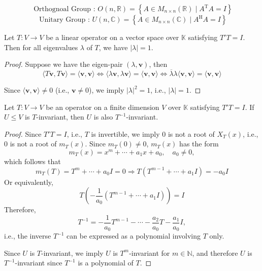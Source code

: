 \begin{definition}
\[
\text{ Orthognoal Group : }O\left( {n,\mathbb{R}}\right)  = \left\{  {A \in  {M}_{n \times  n}\left( \mathbb{R}\right)  \mid  {A}^{\mathrm{T}}A = I}\right\}
\]
\[
\text{ Unitary Group : }U\left( {n,\mathbb{C}}\right)  = \left\{  {A \in  {M}_{n \times  n}\left( \mathbb{C}\right)  \mid  {A}^{\mathrm{H}}A = I}\right\}
\]
\end{definition}


\begin{proposition}
Let \( T : V \rightarrow V \) be a linear operator on a vector space over \( \mathbb{K} \) satisfying \( T' T = I \). Then for all eigenvalues \( \lambda \) of \( T \), we have \( |\lambda| = 1 \).
\end{proposition}

\begin{proof}
Suppose we have the eigen-pair \( (\lambda, \mathbf{v}) \), then
\[
\langle T\mathbf{v}, T\mathbf{v} \rangle = \langle \mathbf{v}, \mathbf{v} \rangle 
\Leftrightarrow \langle \lambda \mathbf{v}, \lambda \mathbf{v} \rangle = \langle \mathbf{v}, \mathbf{v} \rangle 
\Leftrightarrow \overline{\lambda} \lambda \langle \mathbf{v}, \mathbf{v} \rangle = \langle \mathbf{v}, \mathbf{v} \rangle
\]

Since \( \langle \mathbf{v}, \mathbf{v} \rangle \neq 0 \) (i.e., \( \mathbf{v} \neq 0 \)), we imply \( |\lambda|^2 = 1 \), i.e., \( |\lambda| = 1 \).
\end{proof}

\begin{proposition}
Let \( T : V \to V \) be an operator on a finite dimension \( V \) over \( \mathbb{K} \) satisfying \( T'T = I \). If \( U \leq V \) is \( T \)-invariant, then \( U \) is also \( T^{-1} \)-invariant.
\end{proposition}

\begin{proof}
Since \( T'T = I \), i.e., \( T \) is invertible, we imply \( 0 \) is not a root of \( X_T(x) \), i.e., \( 0 \) is not a root of \( m_T(x) \). Since \( m_T(0) \neq 0 \), \( m_T(x) \) has the form
\[
m_T(x) = x^m + \cdots + a_1 x + a_0, \quad a_0 \neq 0,
\]
which follows that
\[
m_T(T) = T^m + \cdots + a_0 I = 0 \Rightarrow T \left( T^{m-1} + \cdots + a_1 I \right) = -a_0 I
\]
Or equivalently,
\[
T \left( -\frac{1}{a_0} (T^{m-1} + \cdots + a_1 I) \right) = I
\]
Therefore,
\[
T^{-1} = -\frac{1}{a_0} T^{m-1} - \cdots - \frac{a_2}{a_0} T - \frac{a_1}{a_0} I,
\]
i.e., the inverse \( T^{-1} \) can be expressed as a polynomial involving \( T \) only.

Since \( U \) is \( T \)-invariant, we imply \( U \) is \( T^m \)-invariant for \( m \in \mathbb{N} \), and therefore \( U \) is \( T^{-1} \)-invariant since \( T^{-1} \) is a polynomial of \( T \).
\end{proof}

